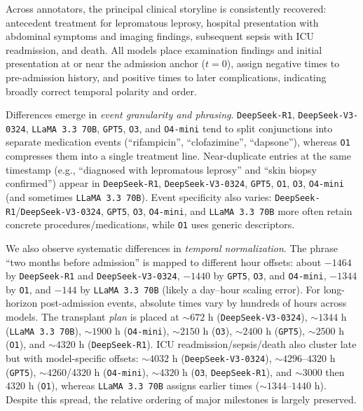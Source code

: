 %



Across annotators, the principal clinical storyline is consistently recovered: antecedent treatment for lepromatous leprosy, hospital presentation with abdominal symptoms and imaging findings, subsequent sepsis with ICU readmission, and death. All models place examination findings and initial presentation at or near the admission anchor ($t{=}0$), assign negative times to pre-admission history, and positive times to later complications, indicating broadly correct temporal polarity and order.

Differences emerge in \textit{event granularity and phrasing}. \texttt{DeepSeek-R1}, \texttt{DeepSeek-V3-0324}, \texttt{LLaMA 3.3 70B}, \texttt{GPT5}, \texttt{O3}, and \texttt{O4-mini} tend to split conjunctions into separate medication events (``rifampicin'', ``clofazimine'', ``dapsone''), whereas \texttt{O1} compresses them into a single treatment line. Near-duplicate entries at the same timestamp (e.g., ``diagnosed with lepromatous leprosy'' and ``skin biopsy confirmed'') appear in \texttt{DeepSeek-R1}, \texttt{DeepSeek-V3-0324}, \texttt{GPT5}, \texttt{O1}, \texttt{O3}, \texttt{O4-mini} (and sometimes \texttt{LLaMA 3.3 70B}). Event specificity also varies: \texttt{DeepSeek-R1}/\texttt{DeepSeek-V3-0324}, \texttt{GPT5}, \texttt{O3}, \texttt{O4-mini}, and \texttt{LLaMA 3.3 70B} more often retain concrete procedures/medications, while \texttt{O1} uses generic descriptors.

We also observe systematic differences in \textit{temporal normalization}. The phrase ``two months before admission'' is mapped to different hour offsets: about $-1464$ by \texttt{DeepSeek-R1} and \texttt{DeepSeek-V3-0324}, $-1440$ by \texttt{GPT5}, \texttt{O3}, and \texttt{O4-mini}, $-1344$ by \texttt{O1}, and $-144$ by \texttt{LLaMA 3.3 70B} (likely a day–hour scaling error). For long-horizon post-admission events, absolute times vary by hundreds of hours across models. The transplant \emph{plan} is placed at $\sim\!672$ h (\texttt{DeepSeek-V3-0324}), $\sim\!1344$ h (\texttt{LLaMA 3.3 70B}), $\sim\!1900$ h (\texttt{O4-mini}), $\sim\!2150$ h (\texttt{O3}), $\sim\!2400$ h (\texttt{GPT5}), $\sim\!2500$ h (\texttt{O1}), and $\sim\!4320$ h (\texttt{DeepSeek-R1}). ICU readmission/sepsis/death also cluster late but with model-specific offsets: $\sim\!4032$ h (\texttt{DeepSeek-V3-0324}), $\sim\!4296$–$4320$ h (\texttt{GPT5}), $\sim\!4260$/$4320$ h (\texttt{O4-mini}), $\sim\!4320$ h (\texttt{O3}, \texttt{DeepSeek-R1}), and $\sim\!3000$ then $4320$ h (\texttt{O1}), whereas \texttt{LLaMA 3.3 70B} assigns earlier times ($\sim\!1344$–$1440$ h). Despite this spread, the relative ordering of major milestones is largely preserved.

